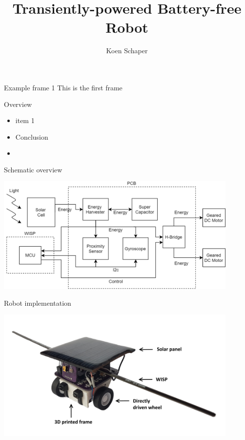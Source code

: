 \documentclass{beamer}
\title[]{Transiently-powered Battery-free Robot}
\institute[]{Delft University of Technology, The Netherlands}
\author{Koen Schaper}
\begin{document}
{
\frame{\titlepage}
}

{

}

\begin{frame}{Example frame 1}
This is the first frame
\end{frame}

\begin{frame}{Overview}
	\begin{itemize}
		\item item 1
		\item Conclusion
		\item 
	\end{itemize}
\end{frame}

\begin{frame}{Schematic overview}
	\begin{center}
		\includegraphics[width=0.9\textwidth]{pics/schematic_robot_v2.png}
	\end{center}
\end{frame}

\begin{frame}{Robot implementation}
	\begin{center}
		\includegraphics[width=0.9\textwidth]{pics/tp_robot2.png}
	\end{center}
\end{frame}
\end{document}
